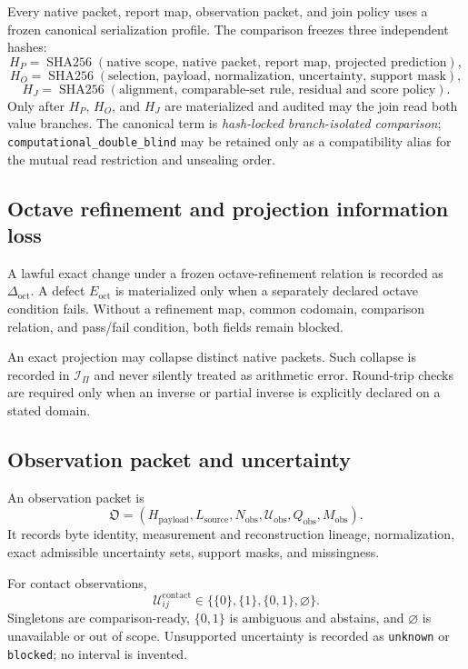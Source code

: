 Every native packet, report map, observation packet, and join policy uses a frozen canonical serialization profile.  The comparison freezes three independent hashes:
\[
H_P=\operatorname{SHA256}(\text{native scope, native packet, report map, projected prediction}),
\]
\[
H_O=\operatorname{SHA256}(\text{selection, payload, normalization, uncertainty, support mask}),
\]
\[
H_J=\operatorname{SHA256}(\text{alignment, comparable-set rule, residual and score policy}).
\]
Only after $H_P$, $H_O$, and $H_J$ are materialized and audited may the join read both value branches.  The canonical term is \emph{hash-locked branch-isolated comparison}; \texttt{computational\_double\_blind} may be retained only as a compatibility alias for the mutual read restriction and unsealing order.

\subsection{Octave refinement and projection information loss}

A lawful exact change under a frozen octave-refinement relation is recorded as $\Delta_{\mathrm{oct}}$.  A defect $E_{\mathrm{oct}}$ is materialized only when a separately declared octave condition fails.  Without a refinement map, common codomain, comparison relation, and pass/fail condition, both fields remain blocked.

An exact projection may collapse distinct native packets.  Such collapse is recorded in $\mathcal I_{\Pi}$ and never silently treated as arithmetic error.  Round-trip checks are required only when an inverse or partial inverse is explicitly declared on a stated domain.

\subsection{Observation packet and uncertainty}

An observation packet is
\[
\mathfrak O
=
(H_{\mathrm{payload}},L_{\mathrm{source}},N_{\mathrm{obs}},\mathcal U_{\mathrm{obs}},Q_{\mathrm{obs}},M_{\mathrm{obs}}).
\]
It records byte identity, measurement and reconstruction lineage, normalization, exact admissible uncertainty sets, support masks, and missingness.

For contact observations,
\[
\mathcal U_{ij}^{\mathrm{contact}}
\in\bigl\{\{0\},\{1\},\{0,1\},\varnothing\bigr\}.
\]
Singletons are comparison-ready, $\{0,1\}$ is ambiguous and abstains, and $\varnothing$ is unavailable or out of scope.  Unsupported uncertainty is recorded as \texttt{unknown} or \texttt{blocked}; no interval is invented.

